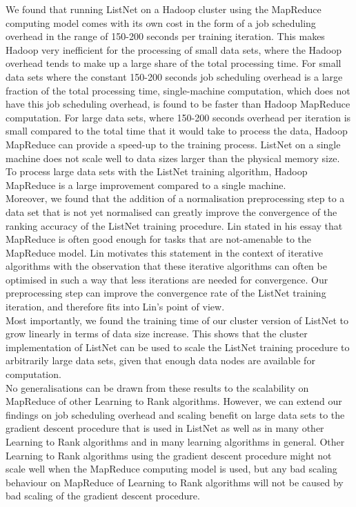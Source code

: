 We found that running ListNet on a Hadoop cluster using the MapReduce computing model comes with its own cost in the form of a job scheduling overhead in the range of 150-200 seconds per training iteration. This makes Hadoop very inefficient for the processing of small data sets, where the Hadoop overhead tends to make up a large share of the total processing time. For small data sets where the constant 150-200 seconds job scheduling overhead is a large fraction of the total processing time, single-machine computation, which does not have this job scheduling overhead, is found to be faster than Hadoop MapReduce computation. For large data sets, where 150-200 seconds overhead per iteration is small compared to the total time that it would take to process the data, Hadoop MapReduce can provide a speed-up to the training process. ListNet on a single machine does not scale well to data sizes larger than the physical memory size. To process large data sets with the ListNet training algorithm, Hadoop MapReduce is a large improvement compared to a single machine.\\

Moreover, we found that the addition of a normalisation preprocessing step to a data set that is not yet normalised can greatly improve the convergence of the ranking accuracy of the ListNet training procedure. Lin stated in his essay \cite{Lin2013} that MapReduce is often good enough for tasks that are not-amenable to the MapReduce model. Lin motivates this statement in the context of iterative algorithms with the observation that these iterative algorithms can often be optimised in such a way that less iterations are needed for convergence. Our preprocessing step can improve the convergence rate of the ListNet training iteration, and therefore fits into Lin's point of view.\\

Most importantly, we found the training time of our cluster version of ListNet to grow linearly in terms of data size increase. This shows that the cluster implementation of ListNet can be used to scale the ListNet training procedure to arbitrarily large data sets, given that enough data nodes are available for computation.\\

No generalisations can be drawn from these results to the scalability on MapReduce of other Learning to Rank algorithms. However, we can extend our findings on job scheduling overhead and scaling benefit on large data sets to the gradient descent procedure that is used in ListNet as well as in many other Learning to Rank algorithms and in many learning algorithms in general. Other Learning to Rank algorithms using the gradient descent procedure might not scale well when the MapReduce computing model is used, but any bad scaling behaviour on MapReduce of Learning to Rank algorithms will not be caused by bad scaling of the gradient descent procedure.

